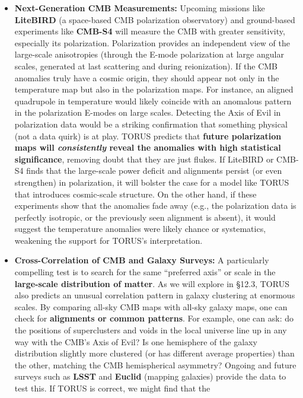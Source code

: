 \begin{itemize}
\item
  \textbf{Next-Generation CMB Measurements:} Upcoming missions like
  \textbf{LiteBIRD} (a space-based CMB polarization observatory) and
  ground-based experiments like \textbf{CMB-S4} will measure the CMB
  with greater sensitivity, especially its polarization. Polarization
  provides an independent view of the large-scale anisotropies (through
  the E-mode polarization at large angular scales, generated at last
  scattering and during reionization). If the CMB anomalies truly have a
  cosmic origin, they should appear not only in the temperature map but
  also in the polarization maps. For instance, an aligned quadrupole in
  temperature would likely coincide with an anomalous pattern in the
  polarization E-modes on large scales. Detecting the Axis of Evil in
  polarization data would be a striking confirmation that something
  physical (not a data quirk) is at play. TORUS predicts that
  \textbf{future polarization maps will \emph{consistently} reveal the
  anomalies with high statistical significance}, removing doubt that
  they are just flukes​. If LiteBIRD or CMB-S4 finds that the
  large-scale power deficit and alignments persist (or even strengthen)
  in polarization, it will bolster the case for a model like TORUS that
  introduces cosmic-scale structure. On the other hand, if these
  experiments show that the anomalies fade away (e.g., the polarization
  data is perfectly isotropic, or the previously seen alignment is
  absent), it would suggest the temperature anomalies were likely chance
  or systematics, weakening the support for TORUS's interpretation.
\item
  \textbf{Cross-Correlation of CMB and Galaxy Surveys:} A particularly
  compelling test is to search for the same ``preferred axis'' or scale
  in the \textbf{large-scale distribution of matter}. As we will explore
  in §12.3, TORUS also predicts an unusual correlation pattern in galaxy
  clustering at enormous scales. By comparing all-sky CMB maps with
  all-sky galaxy maps, one can check for \textbf{alignments or common
  patterns}. For example, one can ask: do the positions of superclusters
  and voids in the local universe line up in any way with the CMB's Axis
  of Evil? Is one hemisphere of the galaxy distribution slightly more
  clustered (or has different average properties) than the other,
  matching the CMB hemispherical asymmetry? Ongoing and future surveys
  such as \textbf{LSST} and \textbf{Euclid} (mapping galaxies) provide
  the data to test this. If TORUS is correct, we might find that the

\end{itemize}
